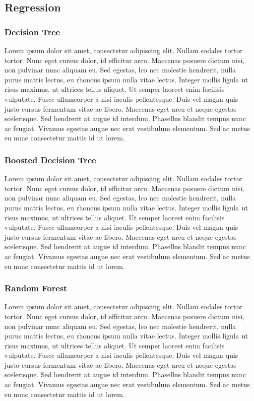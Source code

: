 \subsection{Regression}

\subsubsection{Decision Tree}
Lorem ipsum dolor sit amet, consectetur adipiscing elit. Nullam sodales tortor tortor. Nunc eget cursus dolor, id efficitur arcu. Maecenas posuere dictum nisi, non pulvinar nunc aliquam eu. Sed egestas, leo nec molestie hendrerit, nulla purus mattis lectus, eu rhoncus ipsum nulla vitae lectus. Integer mollis ligula ut risus maximus, ut ultrices tellus aliquet. Ut semper laoreet enim facilisis vulputate. Fusce ullamcorper a nisi iaculis pellentesque. Duis vel magna quis justo cursus fermentum vitae ac libero. Maecenas eget arcu et neque egestas scelerisque. Sed hendrerit at augue id interdum. Phasellus blandit tempus nunc ac feugiat. Vivamus egestas augue nec erat vestibulum elementum. Sed ac metus eu nunc consectetur mattis id ut lorem.

\subsubsection{Boosted Decision Tree}
Lorem ipsum dolor sit amet, consectetur adipiscing elit. Nullam sodales tortor tortor. Nunc eget cursus dolor, id efficitur arcu. Maecenas posuere dictum nisi, non pulvinar nunc aliquam eu. Sed egestas, leo nec molestie hendrerit, nulla purus mattis lectus, eu rhoncus ipsum nulla vitae lectus. Integer mollis ligula ut risus maximus, ut ultrices tellus aliquet. Ut semper laoreet enim facilisis vulputate. Fusce ullamcorper a nisi iaculis pellentesque. Duis vel magna quis justo cursus fermentum vitae ac libero. Maecenas eget arcu et neque egestas scelerisque. Sed hendrerit at augue id interdum. Phasellus blandit tempus nunc ac feugiat. Vivamus egestas augue nec erat vestibulum elementum. Sed ac metus eu nunc consectetur mattis id ut lorem.

\subsubsection{Random Forest}
Lorem ipsum dolor sit amet, consectetur adipiscing elit. Nullam sodales tortor tortor. Nunc eget cursus dolor, id efficitur arcu. Maecenas posuere dictum nisi, non pulvinar nunc aliquam eu. Sed egestas, leo nec molestie hendrerit, nulla purus mattis lectus, eu rhoncus ipsum nulla vitae lectus. Integer mollis ligula ut risus maximus, ut ultrices tellus aliquet. Ut semper laoreet enim facilisis vulputate. Fusce ullamcorper a nisi iaculis pellentesque. Duis vel magna quis justo cursus fermentum vitae ac libero. Maecenas eget arcu et neque egestas scelerisque. Sed hendrerit at augue id interdum. Phasellus blandit tempus nunc ac feugiat. Vivamus egestas augue nec erat vestibulum elementum. Sed ac metus eu nunc consectetur mattis id ut lorem.

